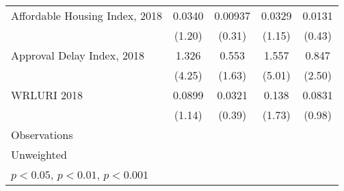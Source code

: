 \begin{table}[htbp]
\begin{tabular}{l*{4}{c}}
\addlinespace
Affordable Housing Index, 2018&      0.0340         &     0.00937         &      0.0329         &      0.0131         \\
                    &      (1.20)         &      (0.31)         &      (1.15)         &      (0.43)         \\
\addlinespace
Approval Delay Index, 2018&       1.326\sym{***}&       0.553         &       1.557\sym{***}&       0.847\sym{*}  \\
                    &      (4.25)         &      (1.63)         &      (5.01)         &      (2.50)         \\
\addlinespace
WRLURI 2018         &      0.0899         &      0.0321         &       0.138         &      0.0831         \\
                    &      (1.14)         &      (0.39)         &      (1.73)         &      (0.98)         \\
\midrule
Observations        &                     &                     &                     &                     \\
\bottomrule
\multicolumn{5}{l}{\footnotesize Unweighted}\\
\multicolumn{5}{l}{\footnotesize \sym{*} \(p<0.05\), \sym{**} \(p<0.01\), \sym{***} \(p<0.001\)}\\
\end{tabular}
\end{table}
